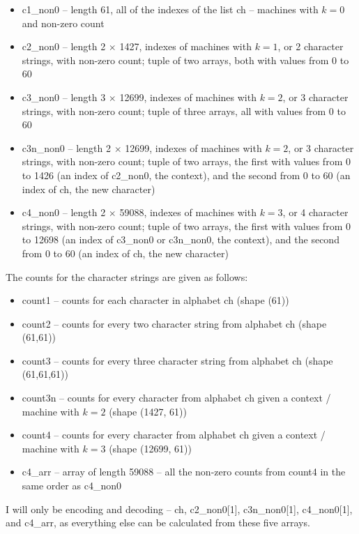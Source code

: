 \documentclass{article}
\begin{document}
\begin{itemize}
\item c1\_non0 -- length 61, all of the indexes of the list ch -- machines with $k = 0$ and non-zero count
\item c2\_non0 -- length 2 $\times$ 1427, indexes of machines with $k = 1$, or 2 character strings, with non-zero count; tuple of two arrays, both with values from 0 to 60
\item c3\_non0 -- length 3 $\times$ 12699, indexes of machines with $k = 2$, or 3 character strings, with non-zero count; tuple of three arrays, all with values from 0 to 60
 \item c3n\_non0 -- length 2 $\times$ 12699, indexes of machines with $k = 2$, or 3 character strings, with non-zero count; tuple of two arrays, the first with values from 0 to 1426 (an index of c2\_non0, the context), and the second from 0 to 60 (an index of ch, the new character) 
 \item c4\_non0 -- length 2 $\times$ 59088, indexes of machines with $k = 3$, or 4 character strings, with non-zero count; tuple of two arrays, the first with values from 0 to 12698 (an index of c3\_non0 or c3n\_non0, the context), and the second from 0 to 60 (an index of ch, the new character)
 \end{itemize}

\noindent The counts for the character strings are given as follows:

\begin{itemize}
\item count1 -- counts for each character in alphabet ch (shape (61))
\item count2 -- counts for every two character string from alphabet ch (shape (61,61))
\item count3 -- counts for every three character string from alphabet ch (shape (61,61,61))
\item count3n -- counts for every character from alphabet ch given a context /  machine with $k = 2$ (shape (1427, 61))
\item count4 -- counts for every character from alphabet ch given a context / machine with $k = 3$ (shape (12699, 61))
\item c4\_arr -- array of length 59088 -- all the non-zero counts from count4 in the same order as c4\_non0
\end{itemize}

\noindent I will only be encoding and decoding -- ch, c2\_non0[1], c3n\_non0[1], c4\_non0[1], and c4\_arr, as everything else can be calculated from these five arrays. 
\end{document}
